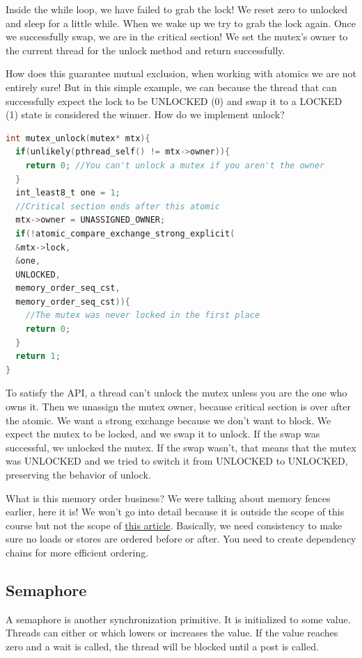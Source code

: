 Inside the while loop, we have failed to grab the lock!
We reset zero to unlocked and sleep for a little while.
When we wake up we try to grab the lock again.
Once we successfully swap, we are in the critical section!
We set the mutex's owner to the current thread for the unlock method and return successfully.

How does this guarantee mutual exclusion, when working with atomics we are not entirely sure!
But in this simple example, we can because the thread that can successfully expect the lock to be UNLOCKED (0) and swap it to a LOCKED (1) state is considered the winner.
How do we implement unlock?

\begin{lstlisting}[language=C]
int mutex_unlock(mutex* mtx){
  if(unlikely(pthread_self() != mtx->owner)){
    return 0; //You can't unlock a mutex if you aren't the owner
  }
  int_least8_t one = 1;
  //Critical section ends after this atomic
  mtx->owner = UNASSIGNED_OWNER;
  if(!atomic_compare_exchange_strong_explicit(
  &mtx->lock,
  &one,
  UNLOCKED,
  memory_order_seq_cst,
  memory_order_seq_cst)){
    //The mutex was never locked in the first place
    return 0;
  }
  return 1;
}
\end{lstlisting}

To satisfy the API, a thread can't unlock the mutex unless you are the one who owns it.
Then we unassign the mutex owner, because critical section is over after the atomic.
We want a strong exchange because we don't want to block.
We expect the mutex to be locked, and we swap it to unlock.
If the swap was successful, we unlocked the mutex.
If the swap wasn't, that means that the mutex was UNLOCKED and we tried to switch it from UNLOCKED to UNLOCKED, preserving the behavior of unlock.

What is this memory order business?
We were talking about memory fences earlier, here it is!
We won't go into detail because it is outside the scope of this course but not the scope of \href{https://gcc.gnu.org/wiki/Atomic/GCCMM/AtomicSync}{this article}.
Basically, we need consistency to make sure no loads or stores are ordered before or after.
You need to create dependency chains for more efficient ordering.

\subsection{Semaphore}

A semaphore is another synchronization primitive.
It is initialized to some value.
Threads can either  or  which lowers or increases the value.
If the value reaches zero and a wait is called, the thread will be blocked until a post is called.

